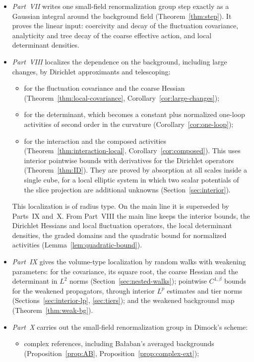 \begin{itemize}
\item \emph{Part~VII} writes one small-field renormalization group step exactly as a Gaussian integral around the background field (Theorem~\ref{thm:step}). It proves the linear input: coercivity and decay of the fluctuation covariance, analyticity and tree decay of the coarse effective action, and local determinant densities.
\item \emph{Part~VIII} localizes the dependence on the background, including large changes, by Dirichlet approximants and telescoping:
  \begin{itemize}
  \item for the fluctuation covariance and the coarse Hessian (Theorem~\ref{thm:local-covariance}, Corollary~\ref{cor:large-changes});
  \item for the determinant, which becomes a constant plus normalized one-loop activities of second order in the curvature (Corollary~\ref{cor:one-loop});
  \item for the interaction and the composed activities (Theorem~\ref{thm:interaction-local}, Corollary~\ref{cor:composed}). This uses interior pointwise bounds with derivatives for the Dirichlet operators (Theorem~\ref{thm:ID}). They are proved by absorption at all scales inside a single cube, for a local elliptic system in which two scalar potentials of the slice projection are additional unknowns (Section~\ref{sec:interior}).
  \end{itemize}
  This localization is of radius type. On the main line it is superseded by Parts~IX and~X. From Part~VIII the main line keeps the interior bounds, the Dirichlet Hessians and local fluctuation operators, the local determinant densities, the graded domains and the quadratic bound for normalized activities (Lemma~\ref{lem:quadratic-bound}).
\item \emph{Part~IX} gives the volume-type localization by random walks with weakening parameters: for the covariance, its square root, the coarse Hessian and the determinant in $L^2$ norms (Section~\ref{sec:nested-walks}); pointwise $C^{1,\beta}$ bounds for the weakened propagators, through interior $L^p$ estimates and tier norms (Sections~\ref{sec:interior-lp}, \ref{sec:tiers}); and the weakened background map (Theorem~\ref{thm:weak-bg}).
\item \emph{Part~X} carries out the small-field renormalization group in Dimock's scheme:
  \begin{itemize}
  \item complex references, including Ba\l aban's averaged backgrounds (Proposition~\ref{prop:AB}, Proposition~\ref{prop:complex-ext});

\end{itemize}
\end{itemize}
